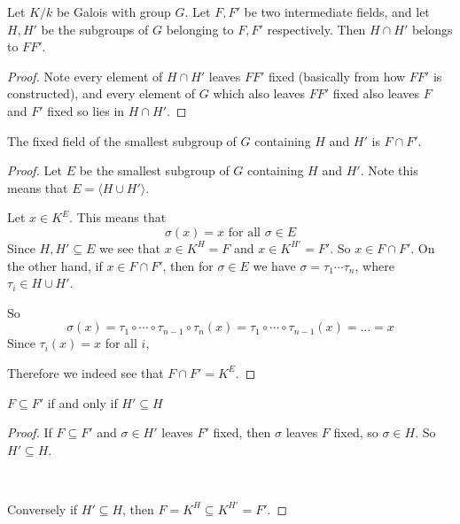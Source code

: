 \begin{corollary}
    Let $K/k$ be Galois with group $G$. Let $F,F'$ be two intermediate fields, and let $H,H'$ be the subgroups of $G$ belonging to $F,F'$ respectively. Then $H\cap H'$ belongs to $FF'$.
    \begin{proof}
        Note every element of $H\cap H'$ leaves $FF'$ fixed (basically from how $FF'$ is constructed), and every element of $G$ which also leaves $FF'$ fixed also leaves $F$ and $F'$ fixed so lies in $H\cap H'$.
    \end{proof}
\end{corollary}

\begin{corollary}
    The fixed field of the smallest subgroup of $G$ containing $H$ and $H'$ is $F\cap F'$.
    \begin{proof}
        Let $E$ be the smallest subgroup of $G$ containing $H$ and $H'$. Note this means that $E = \langle H\cup H' \rangle$. 
        
        Let $x\in K^E$. This means that \[\sigma(x) = x \text{ for all }\sigma\in E\]
        Since $H,H'\subseteq E$ we see that $x\in K^H = F$ and $x\in K^{H'} = F'$. So $x\in F\cap F'$. On the other hand, if $x\in F\cap F'$, then for $\sigma\in E$ we have $\sigma = \tau_1\cdots \tau_n$, where $\tau_i\in H\cup H'$.

        So \[\sigma(x) = \tau_1\circ\cdots \circ \tau_{n-1}\circ \tau_n(x) = \tau_1\circ\cdots \circ \tau_{n-1}(x) = \ldots = x\] Since $\tau_i(x) =x$ for all $i$,

        Therefore we indeed see that $F\cap F' = K^E$.
    \end{proof} 
\end{corollary}
\begin{corollary}
    $F\subseteq F'$ if and only if $H'\subseteq H$

    \begin{proof}
        If $F\subseteq F'$ and $\sigma\in H'$ leaves $F'$ fixed, then $\sigma$ leaves $F$ fixed, so $\sigma\in H$. So $H'\subseteq H$.

        \

        Conversely if $H'\subseteq H$, then $F = K^{H}\subseteq K^{H'} = F'$. 
    \end{proof}
\end{corollary}

